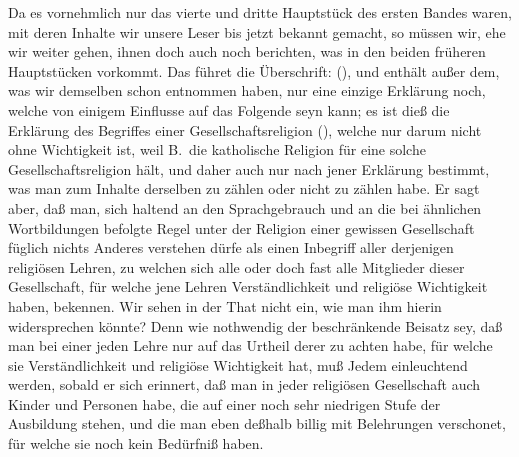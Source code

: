 Da es vornehmlich nur das vierte und dritte Hauptstück des ersten Bandes waren, mit deren Inhalte wir unsere Leser bis jetzt bekannt gemacht, so müssen wir, ehe wir weiter gehen, ihnen doch auch noch berichten, was in den beiden früheren Hauptstücken vorkommt. Das  führet die Überschrift:  (), und enthält außer dem, was wir demselben schon entnommen haben, nur eine einzige Erklärung noch, welche von einigem Einflusse auf das Folgende seyn kann; es ist dieß die Erklärung des Begriffes einer Gesellschaftsreligion (), welche nur darum nicht ohne Wichtigkeit ist, weil B.\ die katholische Religion für eine solche Gesellschaftsreligion hält, und daher auch nur nach jener Erklärung bestimmt, was man zum Inhalte derselben zu zählen oder nicht zu zählen habe. Er sagt aber, daß man, sich haltend an den Sprachgebrauch und an die bei ähnlichen Wortbildungen befolgte Regel unter der Religion einer gewissen Gesellschaft füglich nichts Anderes verstehen dürfe als einen Inbegriff aller derjenigen religiösen Lehren, zu welchen sich alle oder doch fast alle  Mitglieder dieser Gesellschaft, für welche jene Lehren Verständlichkeit und religiöse Wichtigkeit haben, bekennen. Wir sehen in der That nicht ein, wie man ihm hierin widersprechen könnte? Denn wie nothwendig der beschränkende Beisatz sey, daß man bei einer jeden Lehre nur auf das Urtheil derer zu achten habe, für welche sie Verständlichkeit und religiöse Wichtigkeit hat, muß Jedem einleuchtend werden, sobald er sich erinnert, daß man in jeder religiösen Gesellschaft auch Kinder und Personen habe, die auf einer noch sehr niedrigen Stufe der Ausbildung stehen, und die man eben deßhalb billig mit Belehrungen verschonet, für welche sie noch kein Bedürfniß haben. \par

